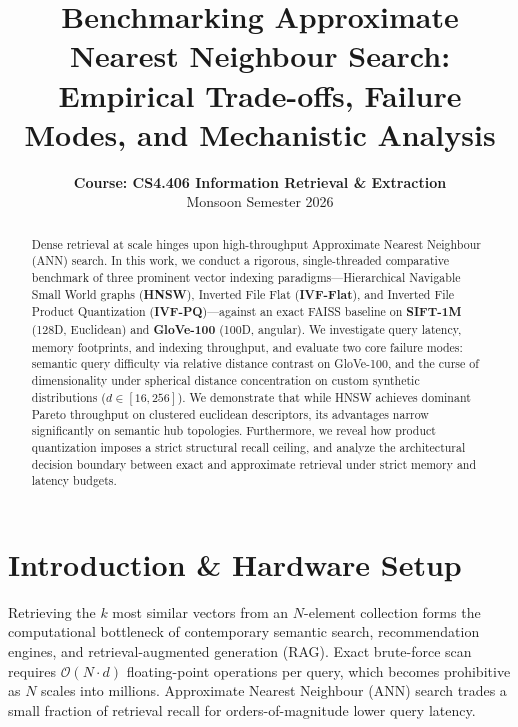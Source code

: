 \documentclass[10pt,twocolumn,a4paper]{article}
\title{\textbf{Benchmarking Approximate Nearest Neighbour Search: \\ Empirical Trade-offs, Failure Modes, and Mechanistic Analysis}}
\author{
    \textbf{Course: CS4.406 Information Retrieval \& Extraction} \\
    Monsoon Semester 2026
}
\date{}
\begin{document}
\maketitle

\begin{abstract}
Dense retrieval at scale hinges upon high-throughput Approximate Nearest Neighbour (ANN) search. In this work, we conduct a rigorous, single-threaded comparative benchmark of three prominent vector indexing paradigms—Hierarchical Navigable Small World graphs (\textbf{HNSW}), Inverted File Flat (\textbf{IVF-Flat}), and Inverted File Product Quantization (\textbf{IVF-PQ})—against an exact FAISS baseline on \textbf{SIFT-1M} (128D, Euclidean) and \textbf{GloVe-100} (100D, angular). We investigate query latency, memory footprints, and indexing throughput, and evaluate two core failure modes: semantic query difficulty via relative distance contrast on GloVe-100, and the curse of dimensionality under spherical distance concentration on custom synthetic distributions ($d \in [16, 256]$). We demonstrate that while HNSW achieves dominant Pareto throughput on clustered euclidean descriptors, its advantages narrow significantly on semantic hub topologies. Furthermore, we reveal how product quantization imposes a strict structural recall ceiling, and analyze the architectural decision boundary between exact and approximate retrieval under strict memory and latency budgets.
\end{abstract}

\section{Introduction \& Hardware Setup}

Retrieving the $k$ most similar vectors from an $N$-element collection forms the computational bottleneck of contemporary semantic search, recommendation engines, and retrieval-augmented generation (RAG). Exact brute-force scan requires $\mathcal{O}(N \cdot d)$ floating-point operations per query, which becomes prohibitive as $N$ scales into millions. Approximate Nearest Neighbour (ANN) search trades a small fraction of retrieval recall for orders-of-magnitude lower query latency.
\end{document}
